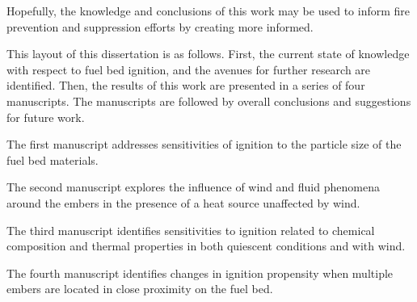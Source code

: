     Hopefully, the knowledge and conclusions of this work may be used to inform fire prevention and suppression efforts by creating more informed.
    
    This layout of this dissertation is as follows. First, the current state of knowledge with respect to fuel bed ignition, and the avenues for further research are identified. Then, the results of this work are presented in a series of four manuscripts. The manuscripts are followed by overall conclusions and suggestions for future work.
    
    The first manuscript addresses sensitivities of ignition to the particle size of the fuel bed materials. 
    
    The second manuscript explores the influence of wind and fluid phenomena around the embers in the presence of a heat source unaffected by wind.
    
    The third manuscript identifies sensitivities to ignition related to chemical composition and thermal properties in both quiescent conditions and with wind. 
    
    The fourth manuscript identifies changes in ignition propensity when multiple embers are located in close proximity on the fuel bed.